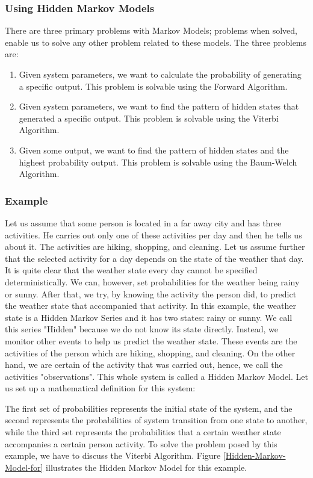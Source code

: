 \documentclass{acm_proc_article-sp}
\begin{document}
\subsubsection{Using Hidden Markov Models}\label{Using-Hidden-Markov-Models}
There are three primary problems with Markov Models; problems when solved, enable us to solve any other problem related to these models. The three problems are:
\begin{enumerate}
    \item Given system parameters, we want to calculate the probability of generating a specific output. This problem is solvable using the Forward Algorithm.
    \item Given system parameters, we want to find the pattern of hidden states that generated a specific output. This problem is solvable using the Viterbi Algorithm.
    \item Given some output, we want to find the pattern of hidden states and the highest probability output. This problem is solvable using the Baum-Welch Algorithm.
\end{enumerate}

\subsubsection{Example}\label{Example}
Let us assume that some person is located in a far away city and has three activities. He carries out only one of these activities per day and then he tells us about it. The activities are hiking, shopping, and cleaning. Let us assume further that the selected activity for a day depends on the state of the weather that day. It is quite clear that the weather state every day cannot be specified deterministically. We can, however, set probabilities for the weather being rainy or sunny. After that, we try, by knowing the activity the person did, to predict the weather state that accompanied that activity. In this example, the weather state is a Hidden Markov Series and it has two states: rainy or sunny. We call this series "Hidden" because we do not know its state directly. Instead, we monitor other events to help us predict the weather state. These events are the activities of the person which are hiking, shopping, and cleaning. On the other hand, we are certain of the activity that was carried out, hence, we call the activities "observations". This whole system is called a Hidden Markov Model. Let us set up a mathematical definition for this system:

The first set of probabilities represents the initial state of the system, and the second represents the probabilities of system transition from one state to another, while the third set represents the probabilities that a certain weather state accompanies a certain person activity. To solve the problem posed by this example, we have to discuss the Viterbi Algorithm. Figure \ref{Hidden-Markov-Model-for} illustrates the Hidden Markov Model for this example.
\end{document}
